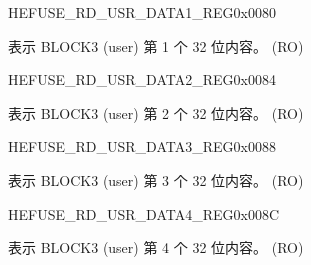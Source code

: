 \begin{register}{H}{EFUSE\_RD\_USR\_DATA1\_REG}{0x0080}\label{regdesc:EFUSERDUSRDATA1REG}
%
\regnewline%
\begin{regdesc}\begin{reglist}
\label{fielddesc:EFUSEUSRDATA1}\item [EFUSE\_USR\_DATA1] 表示 BLOCK3 (user) 第 1 个 32 位内容。 (RO)
\end{reglist}\end{regdesc}
\end{register}


\begin{register}{H}{EFUSE\_RD\_USR\_DATA2\_REG}{0x0084}\label{regdesc:EFUSERDUSRDATA2REG}
%
\regnewline%
\begin{regdesc}\begin{reglist}
\label{fielddesc:EFUSEUSRDATA2}\item [EFUSE\_USR\_DATA2] 表示 BLOCK3 (user) 第 2 个 32 位内容。 (RO)
\end{reglist}\end{regdesc}
\end{register}


\begin{register}{H}{EFUSE\_RD\_USR\_DATA3\_REG}{0x0088}\label{regdesc:EFUSERDUSRDATA3REG}
%
\regnewline%
\begin{regdesc}\begin{reglist}
\label{fielddesc:EFUSEUSRDATA3}\item [EFUSE\_USR\_DATA3] 表示 BLOCK3 (user) 第 3 个 32 位内容。 (RO)
\end{reglist}\end{regdesc}
\end{register}


\begin{register}{H}{EFUSE\_RD\_USR\_DATA4\_REG}{0x008C}\label{regdesc:EFUSERDUSRDATA4REG}
%
\regnewline%
\begin{regdesc}\begin{reglist}
\label{fielddesc:EFUSEUSRDATA4}\item [EFUSE\_USR\_DATA4] 表示 BLOCK3 (user) 第 4 个 32 位内容。 (RO)
\end{reglist}\end{regdesc}
\end{register}


